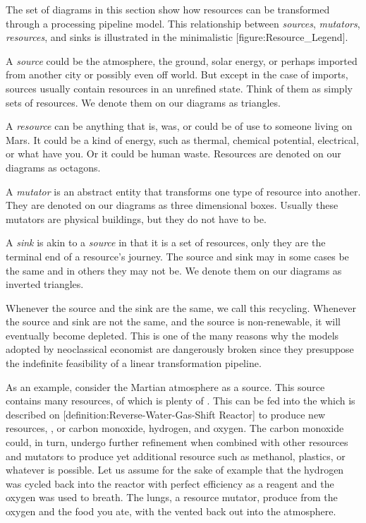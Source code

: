 
The set of diagrams in this section show how resources can be transformed through a processing pipeline model. This relationship between {\it sources}, {\it mutators}, {\it resources}, and sinks is illustrated in the minimalistic [figure:Resource_Legend].

    {}
    
A {\it source} could be the atmosphere, the ground, solar energy, or perhaps imported from another city or possibly even off world. But except in the case of imports, sources usually contain resources in an unrefined state. Think of them as simply sets of resources. We denote them on our diagrams as triangles.

A {\it resource} can be anything that is, was, or could be of use to someone living on Mars. It could be a kind of energy, such as thermal, chemical potential, electrical, or what have you. Or it could be human waste. Resources are denoted on our diagrams as octagons.

A {\it mutator} is an abstract entity that transforms one type of resource into another. They are denoted on our diagrams as three dimensional boxes. Usually these mutators are physical buildings, but they do not have to be.

A {\it sink} is akin to a {\it source} in that it is a set of resources, only they are the terminal end of a resource's journey. The source and sink may in some cases be the same and in others they may not be. We denote them on our diagrams as inverted triangles.

Whenever the source and the sink are the same, we call this recycling. Whenever the source and sink are not the same, and the source is non-renewable, it will eventually become depleted. This is one of the many reasons why the models adopted by neoclassical economist are dangerously broken since they presuppose the indefinite feasibility of a linear transformation pipeline.

As an example, consider the Martian atmosphere as a source. This source contains many resources, of which is plenty of . This  can be fed into the  which is described on [definition:Reverse-Water-Gas-Shift Reactor] to produce new resources, , or carbon monoxide, hydrogen, and oxygen. The carbon monoxide could, in turn, undergo further refinement when combined with other resources and mutators to produce yet additional resource such as methanol, plastics, or whatever is possible. Let us assume for the sake of example that the hydrogen was cycled back into the reactor with perfect efficiency as a reagent and the oxygen was used to breath. The lungs, a resource mutator, produce  from the oxygen and the food you ate, with the  vented back out into the atmosphere.

